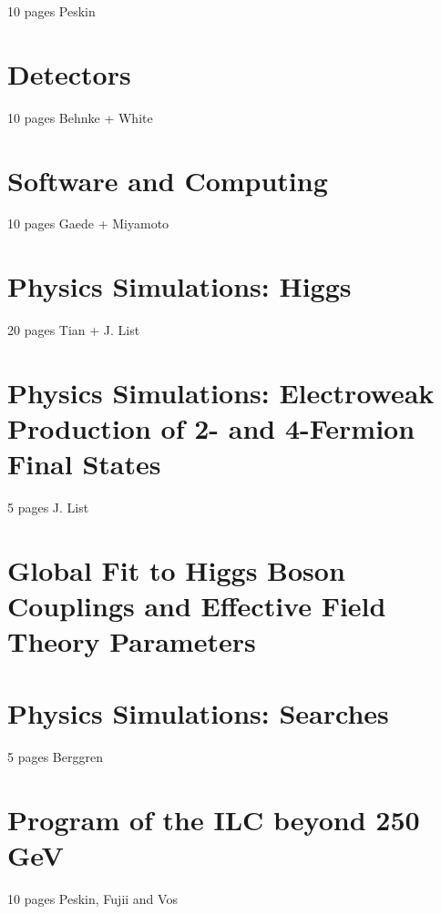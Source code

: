 \documentclass[%
 reprint,
nofootinbib,
 amsmath,amssymb,
 aps,
]{revtex4-1}
\begin{document}
10 pages Peskin
 

 
\section{\label{sec:detectors}Detectors }


  10 pages Behnke + White
  


\section{\label{sec:software}Software and Computing}

   10 pages Gaede + Miyamoto
   
   

\section{\label{sec:higgs}Physics Simulations: Higgs
}


  20 pages Tian + J. List
  
 

\section{\label{sec:ew}Physics Simulations: Electroweak Production of 2- and 4-Fermion Final States }


  5 pages J. List
  
  

\section{\label{sec:global}Global Fit to Higgs Boson Couplings and Effective Field Theory Parameters}

  



\section{\label{sec:searches}Physics Simulations: Searches }


  5 pages Berggren
  
 

\section{\label{sec:ILC-HE}Program of the ILC beyond 250 GeV }
  10 pages Peskin, Fujii and Vos \\
  
\end{document}
